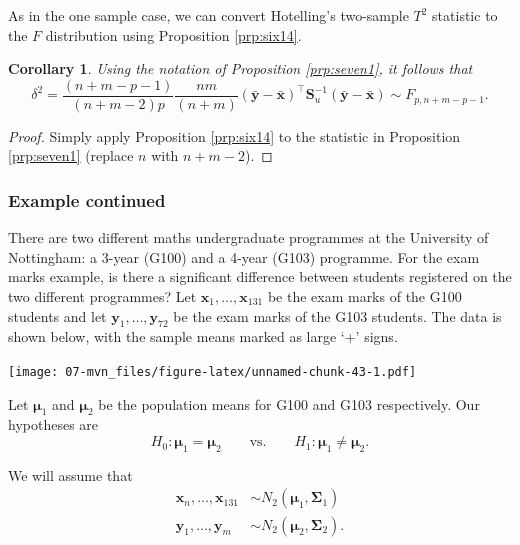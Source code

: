 \documentclass[]{book}
\newtheorem{corollary}{Corollary}[chapter]
\theoremstyle{definition}
\theoremstyle{definition}
\theoremstyle{definition}
\theoremstyle{remark}
\begin{document}
As in the one sample case, we can convert Hotelling's two-sample \(T^2\) statistic to the \(F\) distribution using Proposition \ref{prp:six14}.

\begin{corollary}
\protect\hypertarget{cor:cseven1}{}{\label{cor:cseven1} }Using the notation of Proposition \ref{prp:seven1}, it follows that
\[\delta^2 = \frac{(n+m-p-1)}{(n+m-2)p} \frac{nm}{(n+m)} (\bar{\mathbf y} - \bar{\mathbf x})^\top \mathbf S_u^{-1} (\bar{\mathbf y} - \bar{\mathbf x}) \sim F_{p,n+m-p-1}.\]
\end{corollary}

\begin{proof}
{}Simply apply Proposition \ref{prp:six14} to the statistic in Proposition \ref{prp:seven1} (replace \(n\) with \(n+m-2\)).
\end{proof}

\hypertarget{example-continued-2}{%
\subsubsection*{Example continued}\label{example-continued-2}}

There are two different maths undergraduate programmes at the University of Nottingham: a 3-year (G100) and a 4-year (G103) programme. For the exam marks example, is there a significant difference between students registered on the two different programmes? Let \(\mathbf x_1,\ldots, \mathbf x_{131}\) be the exam marks of the G100 students and let \(\mathbf y_1,\ldots, \mathbf y_{72}\) be the exam marks of the G103 students. The data is shown below, with the sample means marked as large `+' signs.

\texttt{[image: 07-mvn\_files/figure-latex/unnamed-chunk-43-1.pdf]}

Let \({\boldsymbol{\mu}}_1\) and \({\boldsymbol{\mu}}_2\) be the population means for G100 and G103 respectively. Our hypotheses are
\[H_0: {\boldsymbol{\mu}}_1 = {\boldsymbol{\mu}}_2 \qquad \text{vs.} \qquad H_1: {\boldsymbol{\mu}}_1 \neq {\boldsymbol{\mu}}_2.\]

We will assume that
\begin{align*}
\mathbf x_n, \ldots, \mathbf x_{131}&\sim N_2({\boldsymbol{\mu}}_1,\boldsymbol{\Sigma}_1)\\
\mathbf y_1,\ldots,\mathbf y_m &\sim  N_2({\boldsymbol{\mu}}_2,\boldsymbol{\Sigma}_2).
\end{align*}
\end{document}
